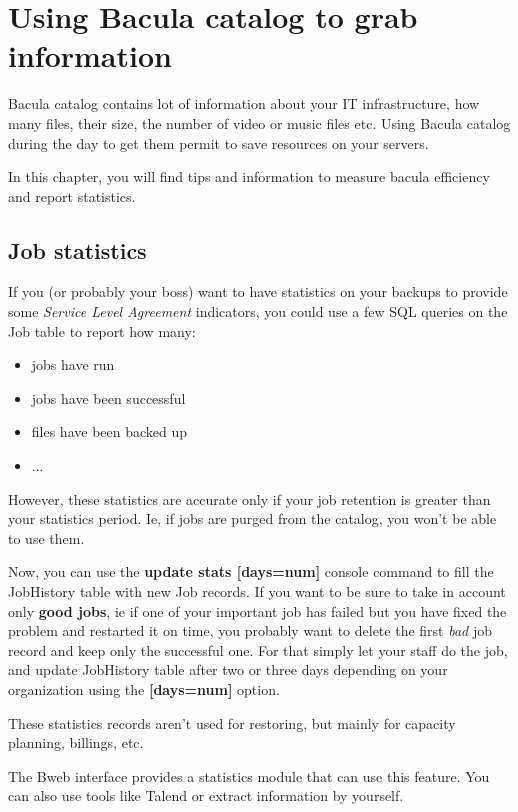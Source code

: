 \chapter{Using Bacula catalog to grab information}
\label{UseBaculaCatalogToExtractInformationChapter}

Bacula catalog contains lot of information about your IT infrastructure, how
many files, their size, the number of video or music files etc. Using Bacula
catalog during the day to get them permit to save resources on your servers.

In this chapter, you will find tips and information to measure bacula
efficiency and report statistics.

\section{Job statistics}
If you (or probably your boss) want to have statistics on your backups to
provide some \textit{Service Level Agreement} indicators, you could use a few
SQL queries on the Job table to report how many:

\begin{itemize}
\item jobs have run
\item jobs have been successful
\item files have been backed up
\item ...
\end{itemize}

However, these statistics are accurate only if your job retention is greater
than your statistics period. Ie, if jobs are purged from the catalog, you won't
be able to use them. 

Now, you can use the \textbf{update stats [days=num]} console command to fill
the JobHistory table with new Job records. If you want to be sure to take in
account only \textbf{good jobs}, ie if one of your important job has failed but
you have fixed the problem and restarted it on time, you probably want to
delete the first \textit{bad} job record and keep only the successful one. For
that simply let your staff do the job, and update JobHistory table after two or
three days depending on your organization using the \textbf{[days=num]} option.

These statistics records aren't used for restoring, but mainly for
capacity planning, billings, etc.

The Bweb interface provides a statistics module that can use this feature. You
can also use tools like Talend or extract information by yourself.

